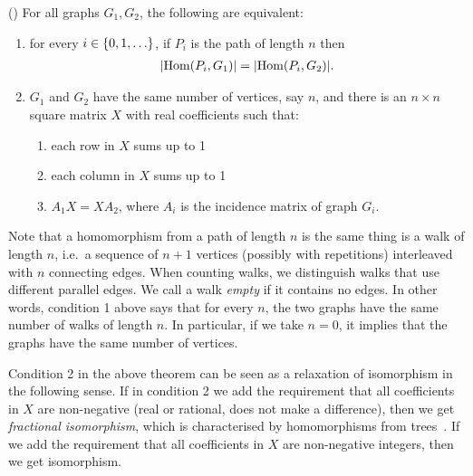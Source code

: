 \begin{theorem}\label{thm:grohe}(\cite[Theorem 2]{groheDellRattan2018})
    For all graphs $G_1,G_2$, the following  are equivalent:
    \begin{enumerate}
        \item for every $i \in \{0,1,\ldots\}$, if $P_i$ is the path of length $n$ then
        \begin{align*}
        |\mathrm {Hom}(P_i,G_1) | = |\mathrm {Hom}(P_i,G_2)|.
        \end{align*}
        \item $G_1$ and $G_2$  have the same number of vertices, say $n$, and there is an $n \times n$ square matrix $X$ with real coefficients such that:
        \begin{enumerate}
            \item each row in $X$ sums up to 1
            \item each column in $X$ sums up to 1
            \item $A_1 X = X A_2$, where $A_i$ is the incidence matrix of graph $G_i$.
        \end{enumerate}
    \end{enumerate}
\end{theorem}
Note that a homomorphism from a path of length $n$ is the same thing is a walk of length $n$, i.e.~a sequence of $n+1$ vertices (possibly with repetitions) interleaved with $n$ connecting edges.  When counting walks, we distinguish walks that use different parallel edges. We call a walk \emph{empty} if it contains no edges. In other words, condition 1 above says that for every $n$, the two graphs have the same number of walks of length $n$. In particular, if we take $n=0$, it implies that the graphs have the same number of vertices.     

Condition 2 in the above theorem can be seen as a relaxation of isomorphism in the following sense. 
If in condition 2 we add the requirement that all coefficients in $X$ are non-negative (real or rational, does not make a difference), then we get  \emph{fractional isomorphism}, which is characterised by homomorphisms from trees~\cite[Theorem 1]{groheDellRattan2018}. If we add the requirement that all coefficients in $X$ are non-negative integers, then we get isomorphism.  

